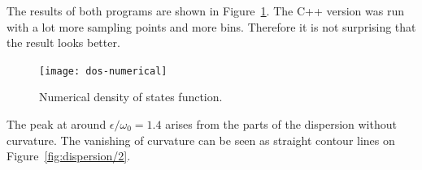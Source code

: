 \documentclass[11pt, english, fleqn, DIV=15, headinclude, BCOR=1cm]{scrartcl}
\begin{document}
The results of both programs are shown in Figure~\ref{fig:dos-numerical}. The
C++ version was run with a lot more sampling points and more bins. Therefore it
is not surprising that the result looks better.

\begin{figure}
    \centering
    \texttt{[image: dos-numerical]}
    \caption{%
        Numerical density of states function.
    }
    \label{fig:dos-numerical}
\end{figure}

The peak at around $\epsilon/\omega_0 = \num{1.4}$ arises from the parts of the
dispersion without curvature. The vanishing of curvature can be seen as
straight contour lines on Figure~\ref{fig:dispersion/2}.
\end{document}
